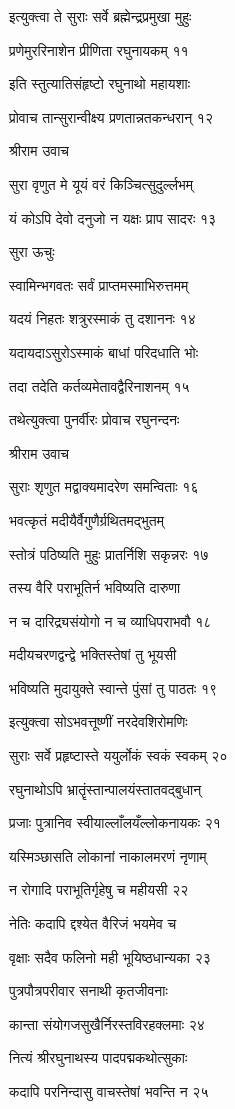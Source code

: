 इत्युक्त्वा ते सुराः सर्वे ब्रह्मेन्द्रप्रमुखा मुहुः

प्रणेमुररिनाशेन प्रीणिता रघुनायकम् ११

इति स्तुत्यातिसंहृष्टो रघुनाथो महायशाः

प्रोवाच तान्सुरान्वीक्ष्य प्रणतान्नतकन्धरान् १२

श्रीराम उवाच

सुरा वृणुत मे यूयं वरं किञ्चित्सुदुर्ल्लभम्

यं कोऽपि देवो दनुजो न यक्षः प्राप सादरः १३

सुरा ऊचुः

स्वामिन्भगवतः सर्वं प्राप्तमस्माभिरुत्तमम्

यदयं निहतः शत्रुरस्माकं तु दशाननः १४

यदायदाऽसुरोऽस्माकं बाधां परिदधाति भोः

तदा तदेति कर्तव्यमेतावद्वैरिनाशनम् १५

तथेत्युक्त्वा पुनर्वीरः प्रोवाच रघुनन्दनः

श्रीराम उवाच

सुराः शृणुत मद्वाक्यमादरेण समन्विताः १६

भवत्कृतं मदीयैर्वैगुणैर्ग्रथितमद्भुतम्

स्तोत्रं पठिष्यति मुहुः प्रातर्निशि सकृन्नरः १७

तस्य वैरि पराभूतिर्न भविष्यति दारुणा

न च दारिद्र्यसंयोगो न च व्याधिपराभवौ १८

मदीयचरणद्वन्द्वे भक्तिस्तेषां तु भूयसी

भविष्यति मुदायुक्ते स्वान्ते पुंसां तु पाठतः १९

इत्युक्त्वा सोऽभवत्तूष्णीं नरदेवशिरोमणिः

सुराः सर्वे प्रहृष्टास्ते ययुर्लोकं स्वकं स्वकम् २०

रघुनाथोऽपि भ्रातॄंस्तान्पालयंस्तातवद्बुधान्

प्रजाः पुत्रानिव स्वीयाल्लाँलयँल्लोकनायकः २१

यस्मिञ्छासति लोकानां नाकालमरणं नृणाम्

न रोगादि पराभूतिर्गृहेषु च महीयसी २२

नेतिः कदापि द्दश्येत वैरिजं भयमेव च

वृक्षाः सदैव फलिनो मही भूयिष्ठधान्यका २३

पुत्रपौत्रपरीवार सनाथी कृतजीवनाः

कान्ता संयोगजसुखैर्निरस्तविरहक्लमाः २४

नित्यं श्रीरघुनाथस्य पादपद्मकथोत्सुकाः

कदापि परनिन्दासु वाचस्तेषां भवन्ति न २५

